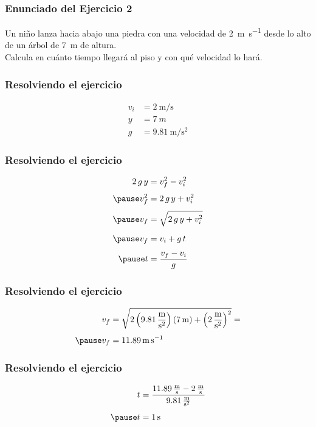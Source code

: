 \documentclass[14pt]{beamer}
\begin{document}
\begin{frame}
\frametitle{Enunciado del Ejercicio 2}
Un niño lanza hacia abajo una piedra con una velocidad de \SI{2}{\meter\per\second} desde lo alto de un árbol de \SI{7}{\meter} de altura. 
\\
\bigskip
\pause
Calcula en cuánto tiempo llegará al piso y con qué velocidad lo hará.
\end{frame}
\begin{frame}
\frametitle{Resolviendo el ejercicio}
\pause
\begin{align*}
v_{i} &= \SI{2}{\meter\per\second} \\[0.5em]
y &= \SI{7}{m} \\[0.5em]
g &= \SI{9.81}{\meter\per\square\second}
\end{align*}
\end{frame}
\begin{frame}
\frametitle{Resolviendo el ejercicio}
\pause
\begin{eqnarray*}
\begin{aligned}
2 \, g \, y &= v_{f}^{2} - v_{i}^{2} \\[0.35em] \pause
v_{f}^{2} &= 2 \, g \, y + v_{i}^{2} \\[0.35em] \pause
v_{f} &= \sqrt{2 \, g \, y + v_{i}^{2}} \\[0.5em] \pause
v_{f} &= v_{i} + g \, t \\[0.35em] \pause
t &= \dfrac{v_{f} - v_{i}}{g}
\end{aligned}
\end{eqnarray*}
\end{frame}
\begin{frame}
\frametitle{Resolviendo el ejercicio}
\pause
\begin{eqnarray*}
\begin{aligned}
v_{f} &= \sqrt{2 \left( \SI[per-mode=fraction]{9.81}{\meter\per\square\second}  \right) \left( \SI{7}{\meter} \right) + \left( \SI[per-mode=fraction]{2}{\meter\per\square\second} \right)^{2}} = \\[0.4em] \pause
v_{f} &= \SI{11.89}{\meter\per\second}
\end{aligned}
\end{eqnarray*}
\end{frame}
\begin{frame}
\frametitle{Resolviendo el ejercicio}
\pause
\begin{eqnarray*}
\begin{aligned}
t &= \dfrac{\SI[per-mode=fraction]{11.89}{\meter\per\second} - \SI[per-mode=fraction]{2}{\meter\per\second}}{\SI[per-mode=fraction]{9.81}{\meter\per\square\second}} \\[0.4em] \pause
t &= \SI{1}{\second}
\end{aligned}
\end{eqnarray*}
\end{frame}
\end{document}
